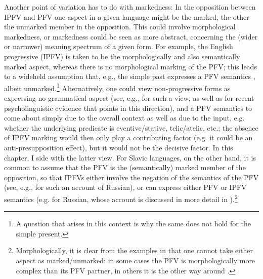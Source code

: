 \documentclass[output=paper,colorlinks,citecolor=brown]{langscibook}
\begin{document}
Another point of variation has to do with markedness: In the opposition between IPFV and PFV one aspect in a given language might be the marked, the other the unmarked member in the opposition. This could involve morphological markedness, or markedness could be seen as more abstract, concerning the (wider or narrower) meaning spectrum of a given form. For example, the English  progressive (IPFV) is taken to be the morphologically and also semantically marked aspect, whereas there is no morphological marking of the PFV; this leads to a wideheld assumption that, e.g., the simple past expresses a PFV semantics \citep[see, e.g.,][]{Smith1991,Klein1994}, albeit unmarked.\footnote{A question that arises in this context is why the same does not hold for the simple present.} Alternatively, one could view non-progressive forms as expressing no grammatical aspect (see, e.g., \citealt{deswart98} for such a view, as well as \citealt{minor+23} for recent psycholinguistic evidence that points in this direction), and a PFV semantics to come about simply due to the overall context as well as due to the input, e.g. whether the underlying predicate is eventive/stative, telic/atelic, etc.; the absence of IPFV marking would then only play a contributing factor (e.g. it could be an anti-presupposition effect), but it would not be the decisive factor. In this chapter, I side with the latter view. For Slavic languages, on the other hand, it is common to assume that the PFV is the (semantically) marked member of the opposition, so that IPFVs either involve the negation of the semantics of the PFV (see, e.g., \citealt{%
Borik2006} for such an account of Russian), or can express either PFV or IPFV semantics (e.g. \citealt{gronn15} for Russian, whose account is discussed in more detail in ).\footnote{Morphologically, it is clear from the examples in  that one cannot take either aspect as marked/unmarked: in some cases the PFV is morphologically more complex than its PFV partner, in others it is the other way around \citep[see also discussion in][]{%
jakobson66}.}
\end{document}
